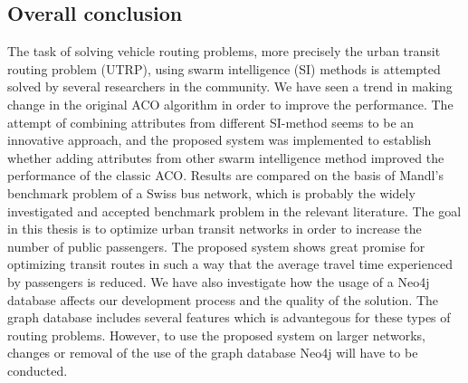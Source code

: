 \subsection*{Overall conclusion}

The task of solving vehicle routing problems, more precisely the urban transit routing problem (UTRP), using swarm intelligence (SI) methods is attempted solved by several researchers in the community. We have seen a trend in making change in the original ACO algorithm in order to improve the performance.  The attempt of combining attributes from different SI-method seems to be an innovative approach, and the proposed system was implemented to establish whether adding attributes from other swarm intelligence method improved the performance of the classic ACO. Results are compared on the basis of Mandl's benchmark problem of a Swiss bus network, which is probably the widely investigated and accepted benchmark problem in the relevant literature. The goal in this thesis is to optimize urban transit networks in order to increase the number of public passengers. The proposed system shows great promise for optimizing transit routes in such a way that the average travel time experienced by passengers is reduced. We have also investigate how the usage of a Neo4j database affects our development process and the quality of the solution. The graph database includes several features which is advantegous for these types of routing problems. However, to use the proposed system on larger networks, changes or removal of the use of the graph database Neo4j will have to be conducted. 




